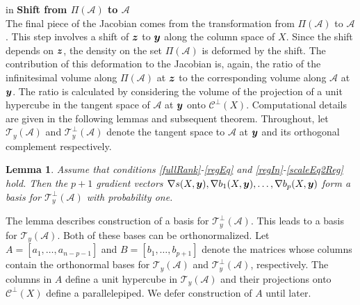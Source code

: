 \documentclass[11pt]{article}
\newcommand{\by}{\mbox{\boldmath $y$}}
\newcommand{\bz}{\mbox{\boldmath $z$}}
\newcommand{\mc}{\mathcal}
\newtheorem{lemma}[theorem]{\bf Lemma}
\begin{document}

 in
\noindent
{\bf Shift from $\Pi(\mathcal{A})$ to $\mathcal{A}$} \\
The final piece of the Jacobian comes from the transformation from
$\Pi(\mathcal{A})$ to $\mathcal{A}$.  %
This step involves a shift of
$\bz$ to $\by$ along the column space of $X$. Since the shift depends on 
$\bz$, the density on the set 
$\Pi(\mathcal{A})$ is deformed by the shift. The
contribution of this deformation to the Jacobian is, again,
the ratio of the infinitesimal volume along $\Pi(\mathcal{A})$ at $\bz$ to the
corresponding volume along $\mathcal{A}$ at $\by$. 
The ratio is calculated by considering the volume of the
projection of a unit hypercube in the tangent space of $\mathcal{A}$
at $\by$ onto $\mc{C}^\perp(X)$.
Computational details are
given in the following lemmas and subsequent theorem. Throughout, let
$\mc T_{y}(\mc A)$ and $\mc T_{y}^{\perp}(\mc A)$ denote the tangent
space to $\mc A$ at $\by$ and its orthogonal complement respectively. 

\begin{lemma}
\label{lem:basis}
Assume that conditions \ref{fullRank}-\ref{regEq} and \ref{regIn}-\ref{scaleEq2Reg} hold.  Then the $p+1$ gradient vectors 
$\nabla s(X,\by), \nabla b_1(X,\by),\dots, \nabla b_p(X,\by)$ form a
basis for $\mc T_{y}^\perp(\mc A)$ with probability one.
\end{lemma}

The lemma describes construction of a basis for $\mc T_{y}^\perp(\mc A)$.  This leads to a 
basis for $\mc T_{y}(\mc A)$.  Both of these bases can be orthonormalized.  
Let $A=[a_{1},\dots,a_{n-p-1}]$  and $B=[b_1,\dots,b_{p+1}]$ denote the 
matrices whose columns contain the orthonormal bases for  $\mc T_{y}(\mc A)$ and  $\mc T^{\perp}_{y}(\mc A)$, respectively.  
The columns in $A$ define a unit hypercube in $\mc T_{y}(\mc
  A)$ and their projections onto $\mc{C}^\perp(X)$ define a parallelepiped.
We defer construction of $A$ until later. 
\end{document}
